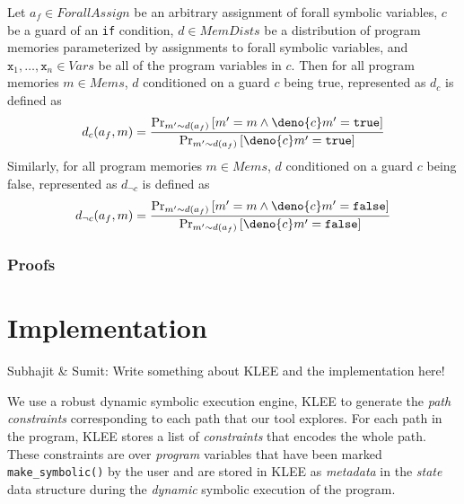 \documentclass[acmsmall]{acmart}\settopmatter{}
\begin{document}
	\begin{definition}
		\label{def:cond}
		Let $a_f \in ForallAssign$ be an arbitrary assignment of forall symbolic variables, $c$ be a guard of an \texttt{if} condition, $d \in MemDists$ be a distribution of program memories parameterized by assignments to forall symbolic variables, and $\mathtt{x}_1,\ldots,\mathtt{x}_n \in Vars$ be all of the program variables in $c$. Then for all program memories $m \in Mems$, $d$ conditioned on a guard $c$ being true, represented as $d_c$ is defined as
		\[
		d_c(a_f,m) = \frac{\Pr_{m' \sim d(a_f)}\left[ m' = m \land \deno{c}m' = \mathtt{true} \right]}{\Pr_{m' \sim d(a_f)}\left[ \deno{c}m' = \mathtt{true} \right]}
		\]
		Similarly, for all program memories $m \in Mems$, $d$ conditioned on a guard $c$ being false, represented as $d_{\neg c}$ is defined as
		\[
		d_{\neg c}(a_f,m) = \frac{\Pr_{m' \sim d(a_f)}\left[ m' = m \land \deno{c}m' = \mathtt{false} \right]}{\Pr_{m' \sim d(a_f)}\left[ \deno{c}m' = \mathtt{false} \right]}
		\]
	\end{definition}
	
	\subsubsection{Proofs}
	\label{sec:proofs}
	
	\section{Implementation}
	\label{sec:implementation}
	
	{\color{red} Subhajit \& Sumit: Write something about KLEE and the implementation here!} 
	
	We use a robust dynamic symbolic execution engine, \textsc{KLEE} to generate the \textit{path constraints} corresponding to each path that our tool explores. For each path in the program, \textsc{KLEE} stores a list of \textit{constraints} that encodes the whole path. These constraints are over \textit{program} variables that have been marked \texttt{make\_symbolic()} by the user and are stored in \textsc{KLEE} as \textit{metadata} in the \textit{state} data structure during the \textit{dynamic} symbolic execution of the program.
	
\end{document}
